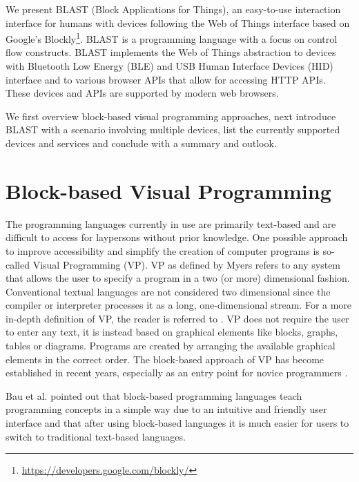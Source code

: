 \documentclass[runningheads]{llncs}
\begin{document}
We present BLAST (Block Applications for Things), an easy-to-use interaction interface for humans with devices following the Web of Things interface based on Google's Blockly\footnote{\url{https://developers.google.com/blockly/}}.
BLAST is a programming language with a focus on control flow constructs.
BLAST implements the Web of Things abstraction to devices with Bluetooth Low Energy (BLE) and USB Human Interface Devices (HID) interface and to various browser APIs that allow for accessing HTTP APIs.
These devices and APIs are supported by modern web browsers.

We first overview block-based visual programming approaches, next introduce BLAST with a scenario involving multiple devices, list the currently supported devices and services and conclude with a summary and outlook.

\section{Block-based Visual Programming}

The programming languages currently in use are primarily text-based and are difficult to access for laypersons without prior knowledge.
One possible approach to improve accessibility and simplify the creation of computer programs is so-called Visual Programming (VP).
VP as defined by Myers \cite{myers1990taxonomies} refers to any system that allows the user to specify a program in a two (or more) dimensional fashion. Conventional textual languages are not considered two dimensional since the compiler or interpreter processes it as a long, one-dimensional stream. For a more in-depth definition of VP, the reader is referred to \cite{burnett1995visual}. 
VP does not require the user to enter any text, it is instead based on graphical elements like blocks, graphs, tables or diagrams.
Programs are created by arranging the available graphical elements in the correct order.
The block-based approach of VP has become established in recent years, especially as an entry point for novice programmers 
\cite{moors2018transitioning} \cite{weintrop2017blocks} \cite{chao2016exploring} \cite{HUNDHAUSEN200722} \cite{10.1145/2787622.2787712}.

Bau et al. \cite{1011453015455} pointed out that block-based programming languages teach programming concepts in a simple way due to an intuitive and friendly user interface and that after using block-based languages it is much easier for users to switch to traditional text-based languages.
\end{document}
